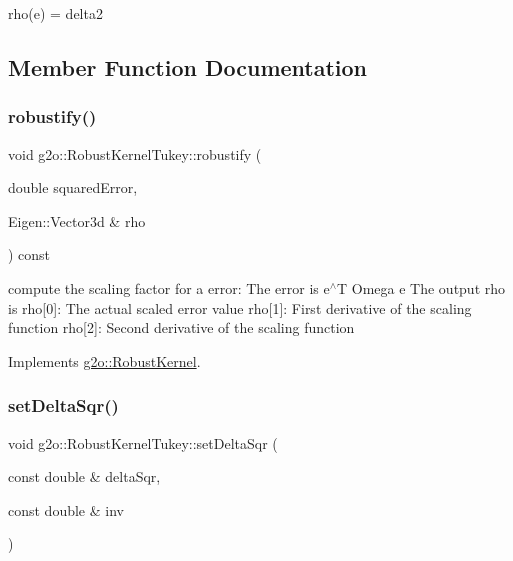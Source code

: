 rho(e) = delta2 

\subsection{Member Function Documentation}
\mbox{\label{classg2o_1_1_robust_kernel_tukey_a415fbc0b4033a8330700e66c60305b13}} 
\subsubsection{\texorpdfstring{robustify()}{robustify()}}
{\footnotesize\ttfamily void g2o\+::\+Robust\+Kernel\+Tukey\+::robustify (\begin{DoxyParamCaption}\item[{double}]{squared\+Error,  }\item[{Eigen\+::\+Vector3d \&}]{rho }\end{DoxyParamCaption}) const\hspace{0.3cm}{\ttfamily [virtual]}}

compute the scaling factor for a error\+: The error is e$^\wedge$T Omega e The output rho is rho\mbox{[}0\mbox{]}\+: The actual scaled error value rho\mbox{[}1\mbox{]}\+: First derivative of the scaling function rho\mbox{[}2\mbox{]}\+: Second derivative of the scaling function 

Implements \mbox{\hyperlink{classg2o_1_1_robust_kernel_ab47b071a0cfe466be063f0104bc41d0f}{g2o\+::\+Robust\+Kernel}}.

\mbox{\label{classg2o_1_1_robust_kernel_tukey_a0602ba130364506d65fb86f3473209aa}} 
\subsubsection{\texorpdfstring{set\+Delta\+Sqr()}{setDeltaSqr()}}
{\footnotesize\ttfamily void g2o\+::\+Robust\+Kernel\+Tukey\+::set\+Delta\+Sqr (\begin{DoxyParamCaption}\item[{const double \&}]{delta\+Sqr,  }\item[{const double \&}]{inv }\end{DoxyParamCaption})\hspace{0.3cm}{\ttfamily [virtual]}}



